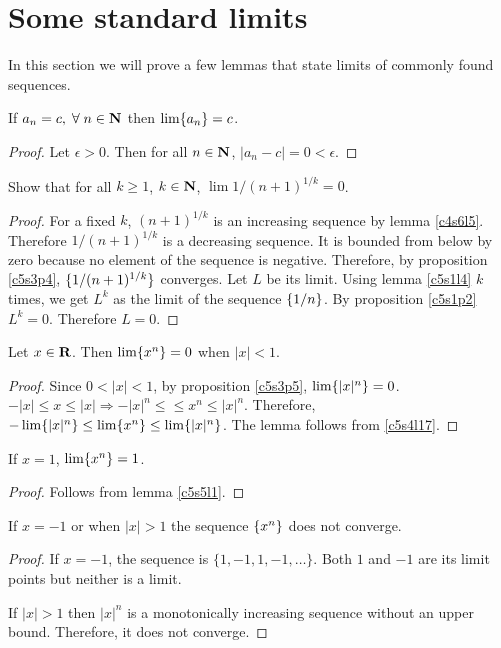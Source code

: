 \section{Some standard limits}\label{c5s5}
In this section we will prove a few lemmas that state limits of commonly
found sequences.
\begin{lem}\label{c5s5l1}
If $a_n = c, \;\forall\; n \in \mathbf{N}$ then $\lim\{a_n\} = c$.
\end{lem}
\begin{proof}
Let $\epsilon > 0$. Then for all $n \in \mathbf{N}$, $|a_n - c| = 0 < \epsilon$.
\end{proof}

\begin{lem}\label{c5s5l2}
Show that for all $k \ge 1$, $k \in \mathbf{N}$, $\lim 1/(n+1)^{1/k} = 0$.
\end{lem}
\begin{proof}
For a fixed $k$, $(n+1)^{1/k}$ is an increasing sequence by lemma 
\ref{c4s6l5}. Therefore $1/(n+1)^{1/k}$ is a decreasing sequence. It is 
bounded from below by zero because no element of the sequence is negative.
Therefore, by proposition \ref{c5s3p4}, $\{1/(n+1)^{1/k}\}$ converges.
Let $L$ be its limit. Using lemma \ref{c5s1l4} $k$ times, we get $L^k$
as the limit of the sequence $\{1/n\}$. By proposition \ref{c5s1p2} $L^k
 = 0$. Therefore $L = 0$.
\end{proof}

\begin{lem}\label{c5s5l3}
Let $x \in \mathbf{R}$. Then $\lim\{x^n\} = 0$ when $|x| < 1$.
\end{lem}
\begin{proof}
Since $0 < |x| < 1$, by proposition \ref{c5s3p5}, $\lim\{|x|^n\} = 0$.
$-|x| \le x \le |x| \Rightarrow -|x|^n \le \le x^n \le |x|^n$. Therefore,
$-\lim\{|x|^n\} \le \lim\{x^n\} \le \lim\{|x|^n\}$. The lemma follows
from \ref{c5s4l17}.
\end{proof}

\begin{lem}\label{c5s5l4}
If $x = 1$, $\lim\{x^n\} = 1$.
\end{lem}
\begin{proof}
Follows from lemma \ref{c5s5l1}.
\end{proof}

\begin{lem}\label{c5s5l5}
If $x = -1$ or when $|x| > 1$ the sequence $\{x^n\}$ does not converge.
\end{lem}
\begin{proof}
If $x = -1$, the sequence is $\{1, -1, 1, -1, \ldots\}$. Both $1$ and $-1$ 
are its limit points but neither is a limit. 

If $|x| > 1$ then $|x|^n$ is a monotonically increasing sequence without an
upper bound. Therefore, it does not converge.
\end{proof}

